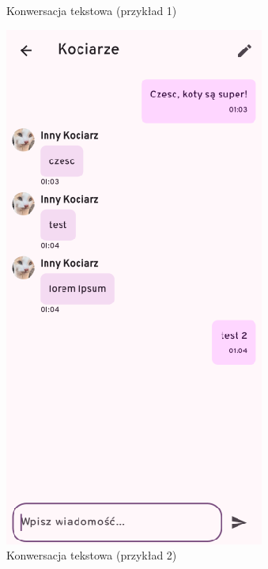 \begin{figure}[H]
\begin{minipage}[b]{0.45\textwidth}
		\caption{Konwersacja tekstowa (przykład 1)}
	\end{minipage}
	\hfill
	\begin{minipage}[b]{0.45\textwidth}
		\centering
		\includegraphics[width=\textwidth]{root/raptchat_chat.png}
		\caption{Konwersacja tekstowa (przykład 2)}
	\end{minipage}
\end{figure}

